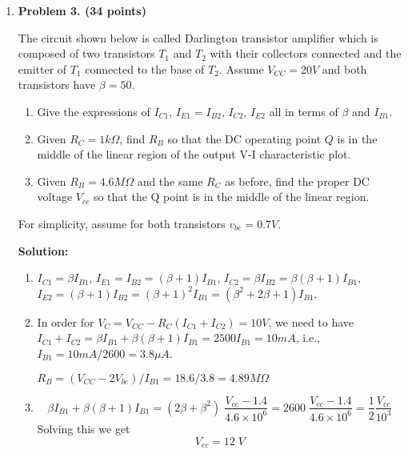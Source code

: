 \begin{enumerate}

 {\bf Solution:} 
 
 Find the load line: 
 When $I_C=0$, $V_{CE}=V_{CC}=12V$, when $V_{CE}=0$, $I_C=V_{CC}/(R_C+R_E)=3mA$
 
 \[ R_{B}=\frac{R_1 R_2}{R_1+R_2}=75K,\;\;\;V_{BB}=12\frac{R_2}{R_1+R_2}=9V \]
 \[ I_B=\frac{V_{BB}-V_{BE}}{R_B+(\beta+1)R_E}=\frac{9-0.7}{75+202}=30\mu A \]
 \[ I_C=\beta I_B=3 mA, \;\;\;\;V_{CE}=V_{CC}-(R_C+R_E)I_C=0V \]
 The DC operating point is in saturation region.
 
 Now we modify $R_2$ to move Q-point to the middel point where $I_C=1.5mA$.
 \[ V_{BB}=12R_2/(100+R_2),\;\;\;\;R_B=100R_2/(100+R_2) \]
 We then plug these into 
 \[ I_C=\beta \frac{V_{BB}-V_{BE}}{(\beta+1) R_E+R_B}=1.5 \]
 and solve it for $R_2$ to get $R_2=55K$.


\item {\bf Problem 3. (34 points)} 

The circuit shown below is called Darlington transistor amplifier which is
composed of two transistors $T_1$ and $T_2$ with their collectors connected 
and the emitter of $T_1$ connected to the base of $T_2$. Assume $V_{CC}=20V$ 
and both transistors have $\beta=50$. 
\begin{enumerate}
\item Give the expressions of $I_{C1}$, $I_{E1}=I_{B2}$, $I_{C2}$, $I_{E2}$
  all in terms of $\beta$ and $I_{B1}$.
\item Given $R_C=1 k\Omega$, find $R_B$ so that the DC operating point $Q$
  is in the middle of the linear region of the output V-I characteristic plot.
\item Given $R_B= 4.6 M\Omega$ and the same $R_C$ as before, find the proper 
DC voltage $V_{cc}$ so that the Q point is in the middle of the linear region.
\end{enumerate}
For simplicity, assume for both transistors $v_{be}=0.7V$.


{\bf Solution:}

\begin{enumerate}
\item $I_{C1}=\beta I_{B1}$, $I_{E1}=I_{B2}=(\beta+1) I_{B1}$, 
  $I_{C2}=\beta I_{B2}=\beta (\beta+1) I_{B1}$, 
  $I_{E2}=(\beta+1) I_{B2}=(\beta+1)^2 I_{B1}=(\beta^2+2\beta+1)I_{B1}$, 

\item In order for $V_C=V_{CC}-R_C (I_{C1}+I_{C2})=10V$, we need to have
  $I_{C1}+I_{C2}=\beta I_{B1}+\beta (\beta+1) I_{B1}=2500 I_{B1}=10 mA$, i.e.,
  $I_{B1}=10 mA/2600=3.8 \mu A$. 

  $R_B=(V_{CC}-2V_{be})/I_{B1}=18.6/3.8=4.89 M\Omega$
\item 
  \[ \beta I_{B1}+\beta (\beta+1) I_{B1}
  =(2\beta+\beta^2)\;\frac{V_{cc}-1.4}{4.6\times 10^6}
  =2600\;\frac{V_{cc}-1.4}{4.6\times 10^6}=\frac{1}{2}\frac{V_{cc}}{10^3} \]
  Solving this we get
  \[ V_{cc}=12\;V \]

\end{enumerate}

\end{enumerate}



